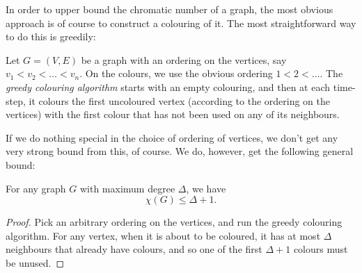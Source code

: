 \documentclass[nobib]{tufte-handout}
\begin{document}
In order to upper bound the chromatic number of a graph, the most obvious approach is of course to construct a colouring of it. The most straightforward way to do this is greedily:

\begin{definition}
  Let $G = (V,E)$ be a graph with an ordering on the vertices, say $v_1 < v_2 <\ldots<v_n$. On the colours, we use the obvious ordering $1 < 2 < \ldots$. The \emph{greedy colouring algorithm} starts with an empty colouring, and then at each time-step, it colours the first uncoloured vertex (according to the ordering on the vertices) with the first colour that has not been used on any of its neighbours.
\end{definition}

If we do nothing special in the choice of ordering of vertices, we don't get any very strong bound from this, of course. We do, however, get the following general bound:

\begin{lemma}\label{lemma:trivial_chi_upper_bound}
  For any graph $G$ with maximum degree $\Delta$, we have
  $$\chi(G) \leq \Delta + 1.$$

  \begin{proof}
    Pick an arbitrary ordering on the vertices, and run the greedy colouring algorithm. For any vertex, when it is about to be coloured, it has at most $\Delta$ neighbours that already have colours, and so one of the first $\Delta + 1$ colours must be unused.
  \end{proof}
\end{lemma}
\end{document}
